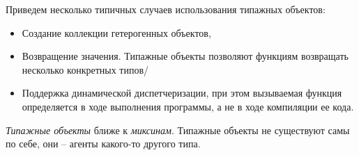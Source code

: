 \documentclass[%
	11pt,
	a4paper,
	utf8,
		]{article}
\begin{document}
Приведем несколько типичных случаев использования типажных объектов:
\begin{itemize}
	\item Создание коллекции гетерогенных объектов,
	
	\item Возвращение значения. Типажные объекты позволяют функциям возвращать несколько конкретных типов/
	
	\item Поддержка динамической диспетчеризации, при этом вызываемая функция определяется в ходе выполнения программы, а не в ходе компиляции ее кода.
\end{itemize}

{\color{blue}
\emph{Типажные объекты} ближе к \emph{миксинам}. Типажные объекты не существуют самы по себе, они -- агенты какого-то другого типа.
}











\begin{thebibliography}{99}
	
\end{thebibliography}


\lstlistoflistings{}
\end{document}
